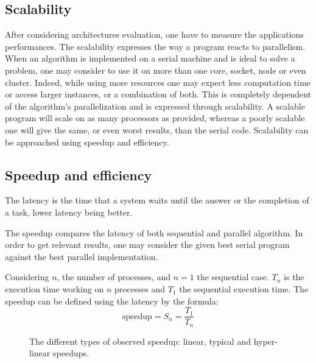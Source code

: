 \subsection{Scalability}

After considering architectures evaluation, one have to measure the applications performances.
The scalability expresses the way a program reacts to parallelism. 
When an algorithm is implemented on a serial machine and is ideal to solve a problem, one may consider to use it on more than one core, socket, node or even cluster. 
Indeed, while using more resources one may expect less computation time or access larger instances, or a combination of both. 
This is completely dependent of the algorithm's parallelization and is expressed through scalability. 
A scalable program will scale on as many processors as provided, whereas a poorly scalable one will give the same, or even worst results, than the serial code.  
Scalability can be approached using speedup and efficiency.

\subsection{Speedup and efficiency}
The latency is the time that a system waits until the answer or the completion of a task, lower latency being better. 

The speedup compares the latency of both sequential and parallel algorithm. 
In order to get relevant results, one may consider the given best serial program against the best parallel implementation.

Considering $n$, the number of processes, and $n=1$ the sequential case.
$T_n$ is the execution time working on $n$ processes and $T_1$ the sequential execution time. 
The speedup can be defined using the latency by the formula: 
\begin{equation}
\text{speedup} = S_n =  \frac{T_1}{T_n}
\end{equation}

\begin{figure}
\centering 
{}
\caption[Representation of typical speedups]{The different types of observed speedup: linear, typical and hyper-linear speedups.}
\label{fig:1_HPC:speedup_obs}
\end{figure}


